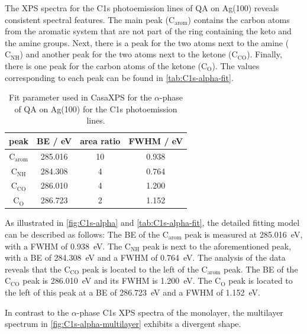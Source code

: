 The \ac{XPS} spectra for the C1s photoemission lines of \ac{QA} on Ag(100) reveals consistent spectral features. The main peak ($\mathrm{C_{arom}}$) contains the carbon atoms from the aromatic system that are not part of the ring containing the keto and the amine groups. Next, there is a peak for the two atoms next to the amine ($\mathrm{C_{NH}}$) and another peak for the two atoms next to the ketone ($\mathrm{C_{CO}}$). Finally, there is one peak for the carbon atoms of the ketone ($\mathrm{C_{O}}$). The values corresponding to each peak can be found in \autoref{tab:C1s-alpha-fit}.

\begin{table}[H]
	\centering
	\caption{Fit parameter used in CasaXPS\autocite{CASA2022} for the $\alpha$-phase of \ac{QA} on Ag(100) for the C1s photoemission lines.}
	\begin{tabular}{|c|c|c|c|}
		\hline
		peak & \ac{BE} / eV & area ratio & FWHM / eV \\
		\hline
		$\mathrm{C_{arom}}$ & 285.016 & 10 & 0.938 \\ \hline
		$\mathrm{C_{NH}}$ & 284.308 & 4 & 0.764 \\ \hline
		$\mathrm{C_{CO}}$ & 286.010 & 4 & 1.200 \\ \hline
		$\mathrm{C_{O}}$ & 286.723 & 2 & 1.152 \\ \hline
	\end{tabular}
	\label{tab:C1s-alpha-fit}
\end{table}

As illustrated in \autoref{fig:C1s-alpha} and \autoref{tab:C1s-alpha-fit}, the detailed fitting model can be described as follows:
The \ac{BE} of the $\mathrm{C_{arom}}$ peak is measured at 285.016~\si{\eV}, with a \ac{FWHM} of 0.938~\si{\eV}. The $\mathrm{C_{NH}}$ peak is next to the aforementioned peak, with a \ac{BE} of 284.308~\si{\eV} and a \ac{FWHM} of 0.764~\si{\eV}. The analysis of the data reveals that the $\mathrm{C_{CO}}$ peak is located to the left of the $\mathrm{C_{arom}}$ peak. The \ac{BE} of the $\mathrm{C_{CO}}$ peak is 286.010~\si{\eV} and its \ac{FWHM} is 1.200~\si{\eV}. The $\mathrm{C_{O}}$ peak is located to the left of this peak at a \ac{BE} of 286.723~\si{\eV} and a \ac{FWHM} of 1.152~\si{\eV}.

In contrast to the $\alpha$-phase C1s \ac{XPS} spectra of the monolayer, the multilayer spectrum in \autoref{fig:C1s-alpha-multilayer} exhibits a divergent shape.

